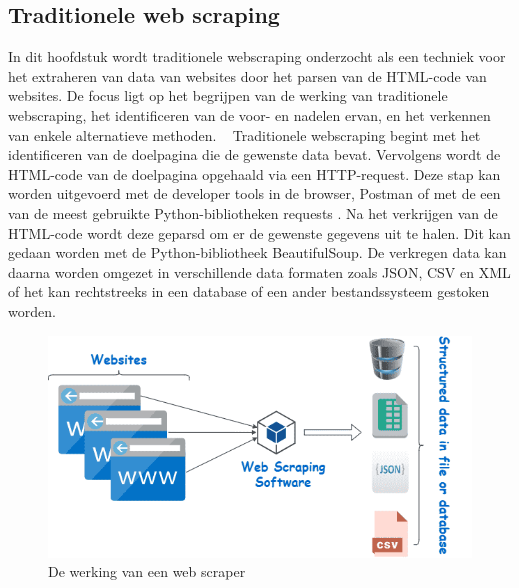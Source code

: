 \subsection{Traditionele web scraping}
In dit hoofdstuk wordt traditionele webscraping  onderzocht als een techniek voor het extraheren van data van websites door het parsen van de HTML-code van websites. De focus ligt op het begrijpen van de werking van traditionele webscraping, het identificeren van de voor- en nadelen ervan, en het verkennen van enkele alternatieve methoden.
~
Traditionele webscraping begint met het identificeren van de doelpagina die de gewenste data bevat. Vervolgens wordt de HTML-code van de doelpagina opgehaald via een HTTP-request. Deze stap kan worden uitgevoerd met de developer tools  in de browser, Postman of met de een van de meest gebruikte Python-bibliotheken requests \autocite{Nate2023}.  Na het verkrijgen van de HTML-code wordt deze geparsd om er de gewenste gegevens uit te halen. Dit kan gedaan worden met de Python-bibliotheek BeautifulSoup. De verkregen data kan daarna worden omgezet in verschillende data formaten zoals JSON, CSV en XML of het kan rechtstreeks  in een database of een ander bestandssysteem gestoken worden.
\begin{figure}[h]
    \includegraphics[width=\linewidth]{graphics/webscraping2.png}
    \caption{De werking van een web scraper \autocite{Kinsta2022}}
    \label{fig:webscraping}
\end{figure}

